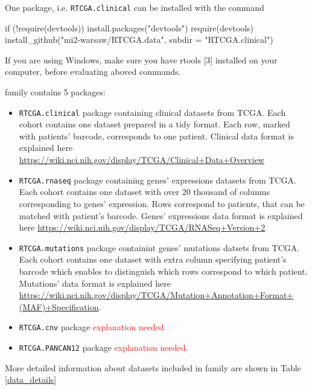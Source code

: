 One package, i.e. \texttt{RTCGA.clinical} can be installed with the
command

\begin{Schunk}
\begin{Sinput}
if (!require(devtools)) {
    install.packages("devtools")
    require(devtools)
}
install_github("mi2-warsaw/RTCGA.data", 
                subdir = "RTCGA.clinical") 
\end{Sinput}
\end{Schunk}

If you are using Windows, make sure you have rtools {[}3{]} installed on
your computer, before evaluating aboved commands.

 family contains 5 packages:

\begin{itemize}
\itemsep1pt\parskip0pt
\item
  \texttt{RTCGA.clinical} package containing clinical datasets from
  TCGA. Each cohort contains one dataset prepared in a tidy format. Each
  row, marked with patients' barcode, corresponds to one patient.
  Clinical data format is explained here
  \url{https://wiki.nci.nih.gov/display/TCGA/Clinical+Data+Overview}
\item
  \texttt{RTCGA.rnaseq} package containing genes' expressions datasets
  from TCGA. Each cohort contains one dataset with over 20 thousand of
  columns corresponding to genes' expression. Rows correspond to
  patients, that can be matched with patient's barcode. Genes'
  expressions data format is explained here
  \url{https://wiki.nci.nih.gov/display/TCGA/RNASeq+Version+2}
\item
  \texttt{RTCGA.mutations} package containint genes' mutations datsets
  from TCGA. Each cohort contains one dataset with extra column
  specifying patient's barcode which enables to distinguish which rows
  correspond to which patient. Mutations' data format is explained here
  \url{https://wiki.nci.nih.gov/display/TCGA/Mutation+Annotation+Format+(MAF)+Specification}.
\item
  \texttt{RTCGA.cnv} package \textcolor{red}{ explanation needed.}
\item
  \texttt{RTCGA.PANCAN12} package \textcolor{red}{ explanation needed.}
\end{itemize}

More detailed information about datasets included in 
family are shown in Table \ref{data_details}

\tiny

